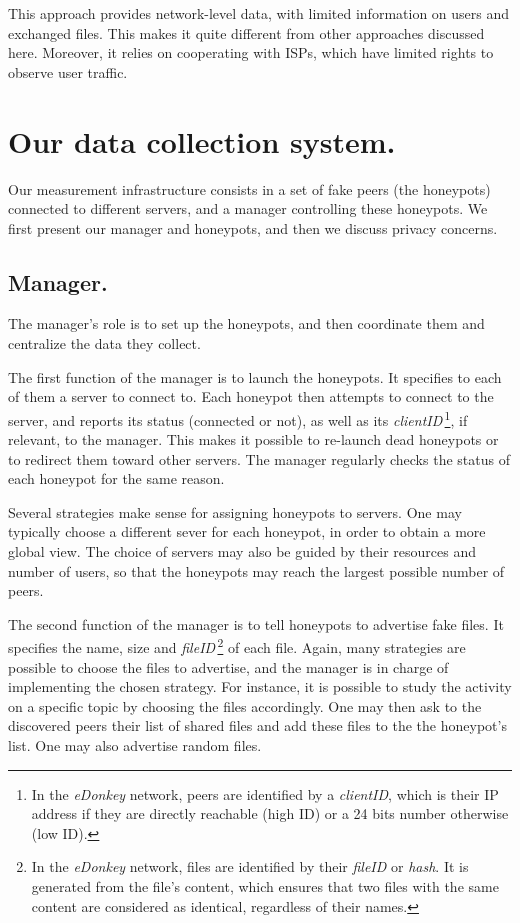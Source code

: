 \documentclass[final,
notitlepage,
narroweqnarray,
	inline,
	twoside,
]{ieee}
\begin{document}
This approach provides network-level data, with limited information on users and exchanged files. This makes it quite different from other approaches discussed here.    
Moreover, it relies on cooperating
with ISPs, which have limited rights to observe user traffic.
\section{Our data collection system.}
\label{sec-honeypots}
Our measurement infrastructure consists in a
set of fake peers (the honeypots) connected to different servers, and
a manager controlling these honeypots. We first present our manager and honeypots,
 and then we discuss privacy concerns.
\subsection{Manager.}
The manager's role is to set up the honeypots,
and then coordinate them and centralize the data they collect.

The first function of the manager is to launch the honeypots. It
specifies to each of them a server to connect to.
Each honeypot then attempts to connect to the server, and reports its status (connected or not), as well as
its {\em clientID}\,\footnote{In the {\em eDonkey} network, peers are
  identified by a { \em clientID}, which is their IP address if they
  are directly reachable (high ID) or a 24 bits number otherwise (low ID). },
if relevant,
to the manager.
This makes it possible to re-launch dead honeypots or to redirect them
toward other servers. The manager regularly
checks the status of each honeypot for the same reason.

Several strategies make sense for assigning honeypots to servers.
One may
typically choose a different sever for each honeypot, in order to obtain
a more global view.
The choice of servers may also be guided by their
resources and number of users, so that the honeypots may reach the
largest possible number of peers.

The second function of the manager is to tell honeypots to
advertise fake files. It specifies the name, size and {\em fileID}\,\footnote{In the {\em eDonkey} network,
  files are identified by their {\em fileID} or {\em hash}. 
  It is generated from the file's content, which ensures that two
  files with the same content are considered as identical, regardless of their names.} of each file.
Again, many strategies are possible to choose the files to advertise,
and the manager is in charge of implementing the chosen strategy.
For instance, it is possible to study the activity on a specific topic by choosing 
 the files accordingly.
One may then ask to the discovered peers their list of shared 
files and add these files to the the honeypot's list. 
One may also advertise random files.
\end{document}
